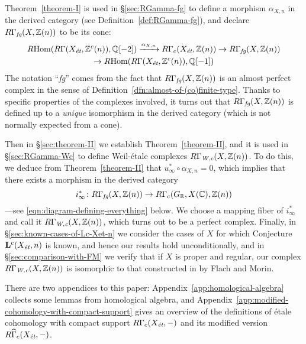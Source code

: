 \documentclass[leqno,12pt]{article}
\theoremstyle{plain}
\theoremstyle{definition}
\DeclareMathOperator{\Hom}{Hom}
\newcommand{\CC}{\mathbb{C}}
\newcommand{\QQ}{\mathbb{Q}}
\newcommand{\RR}{\mathbb{R}}
\newcommand{\ZZ}{\mathbb{Z}}
\newcommand{\Wc}{\text{\it W,c}}
\newcommand{\et}{\text{\it \'{e}t}}
\newcommand{\fg}{\text{\it fg}}
\newcommand{\RHom}{R\!\Hom}
\begin{document}
Theorem~\ref{theorem-I} is used in \S\ref{sec:RGamma-fg} to define a morphism
$\alpha_{X,n}$ in the derived category (see Definition~\ref{def:RGamma-fg}),
and declare $R\Gamma_\fg (X, \ZZ(n))$ to be its cone:
\begin{multline*}
  \RHom (R\Gamma (X_\et, \ZZ^c (n)), \QQ [-2]) \xrightarrow{\alpha_{X,n}}
  R\Gamma_c (X_\et, \ZZ (n)) \to
  R\Gamma_\fg (X, \ZZ(n)) \\
  \to \RHom (R\Gamma (X_\et, \ZZ^c (n)), \QQ [-1])
\end{multline*}
The notation ``\emph{fg}'' comes from the fact that $R\Gamma_\fg (X, \ZZ(n))$ is
an almost perfect complex in the sense of
Definition~\ref{dfn:almost-of-(co)finite-type}. Thanks to specific properties of
the complexes involved, it turns out that $R\Gamma_\fg (X, \ZZ(n))$ is defined
up to a \emph{unique} isomorphism in the derived category (which is not normally
expected from a cone).

Then in \S\ref{sec:theorem-II} we establish Theorem~\ref{theorem-II}, and it is
used in \S\ref{sec:RGamma-Wc} to define Weil-\'{e}tale complexes
$R\Gamma_\Wc (X, \ZZ(n))$. To do this, we deduce from Theorem~\ref{theorem-II}
that $u_\infty^* \circ \alpha_{X,n} = 0$, which implies that there exists a
morphism in the derived category
$$i_\infty^*\colon R\Gamma_\fg (X, \ZZ (n)) \to R\Gamma_c (G_\RR, X (\CC), \ZZ(n))$$
---see \eqref{eqn:diagram-defining-everything} below. We choose a mapping fiber
of $i_\infty^*$ and call it $R\Gamma_\Wc (X, \ZZ (n))$, which turns out to be a
perfect complex.  Finally, in \S\ref{sec:known-cases-of-Lc-Xet-n} we consider
the cases of $X$ for which Conjecture $\mathbf{L}^c (X_\et, n)$ is known,
and hence our results hold unconditionally, and in
\S\ref{sec:comparison-with-FM} we verify that if $X$ is proper and regular, our
complex $R\Gamma_\Wc (X, \ZZ (n))$ is isomorphic to that constructed in
\cite{Flach-Morin-2018} by Flach and Morin.

There are two appendices to this paper: Appendix~\ref{app:homological-algebra}
collects some lemmas from homological algebra, and
Appendix~\ref{app:modified-cohomology-with-compact-support} gives an overview of
the definitions of \'{e}tale cohomology with compact support
$R\Gamma_c (X_\et, -)$ and its modified version
$R\widehat{\Gamma}_c (X_\et, -)$.

\vspace{1em}
\end{document}

